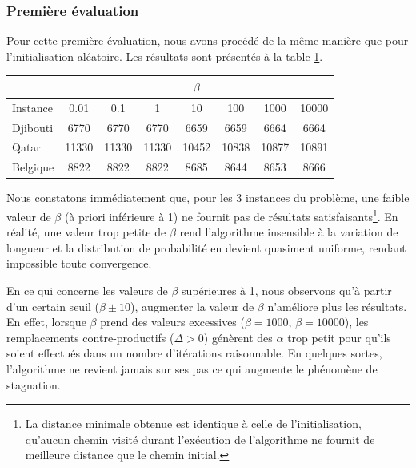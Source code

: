 \documentclass[a4paper, 12pt]{report}
\begin{document}
    \subsubsection{Première évaluation}
    Pour cette première évaluation, nous avons procédé de la même manière que pour l'initialisation aléatoire. Les résultats sont présentés à la table \ref{tab:beta_for_heuristic}.\par
    \begin{table}[H]
    	\centering
    	\begin{tabular}{|l|c|c|c|c|c|c|c|}
    		\cline{2-8}
    		\multicolumn{1}{c|}{} & \multicolumn{7}{c|}{$\beta$} \\ \hline
    		Instance & \num{0.01} & \num{0.1} & \num{1} & \num{10} & \num{100} & \num{1000} & \num{10000}\\ \hline
    		\hline
    		Djibouti & \num{6770} & \num{6770} & \num{6770} & \num{6659} & \num{6659} & \num{6664} & \num{6664}\\ \hline
    		Qatar & \num{11330} & \num{11330} & \num{11330} & \num{10452} & \num{10838} & \num{10877} & \num{10891}\\ \hline
    		Belgique & \num{8822} & \num{8822} & \num{8822} & \num{8685} & \num{8644} & \num{8653} & \num{8666}\\ \hline
    	\end{tabular}
    	\label{tab:beta_for_heuristic}
    \end{table}
    Nous constatons immédiatement que, pour les 3 instances du problème, une faible valeur de $\beta$ (à priori inférieure à 1) ne fournit pas de résultats satisfaisants\footnote{La distance minimale obtenue est identique à celle de l'initialisation, \cad{} qu'aucun chemin visité durant l'exécution de l'algorithme ne fournit de meilleure distance que le chemin initial.}. En réalité, une valeur trop petite de $\beta$ rend l'algorithme insensible à la variation de longueur et la distribution de probabilité en devient quasiment uniforme, rendant impossible toute convergence. \par
    En ce qui concerne les valeurs de $\beta$ supérieures à 1, nous observons qu'à partir d'un certain seuil ($\beta \pm 10$), augmenter la valeur de $\beta$ n'améliore plus les résultats. En effet, lorsque $\beta$ prend des valeurs excessives ($\beta = \num{1000}$, $\beta = \num{10000}$), les remplacements contre-productifs ($\Delta > 0$) génèrent des $\alpha$ trop petit
    pour qu'ils soient effectués dans un nombre d'itérations raisonnable. En quelques sortes, l'algorithme ne revient jamais sur ses pas ce qui augmente le phénomène de stagnation.
\end{document}
